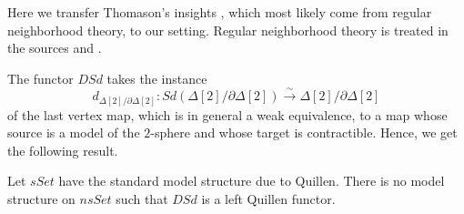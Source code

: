 Here we transfer Thomason's insights \cite[Prop.~4.3]{Th80}, which most likely come from regular neighborhood theory, to our setting. Regular neighborhood theory is treated in the sources \cite[§3]{RS72} and \cite[§II]{Hu69}.

The functor $DSd$ takes the instance
\[d_{\Delta [2]/\partial \Delta [2]}:Sd(\Delta [2]/\partial \Delta [2])\xrightarrow{\sim } \Delta [2]/\partial \Delta [2]\]
of the last vertex map, which is in general a weak equivalence, to a map whose source is a model of the $2$-sphere and whose target is contractible. Hence, we get the following result.
\begin{lemma}\label{lem:non-existence_result_mod_str}
Let $sSet$ have the standard model structure due to Quillen. There is no model structure on $nsSet$ such that $DSd$ is a left Quillen functor.
\end{lemma}
